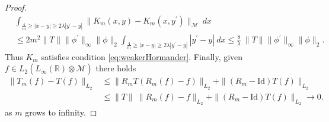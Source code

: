 \documentclass[10pt,a4paper]{amsart}
\newcommand{\Avnat}{\Linfty(\mathbb{R}) \overline{\otimes} \mathcal{M}}
\newcommand{\Linfty}{L_\infty}
\newcommand{\Ltwo}{L_2}
\newcommand{\id}{\mathrm{Id}}
\begin{document}
\begin{proof}
        \begin{align*}
            &\int_{\frac{4}{m} \geq |x-y| \geq 2\lambda |y^\prime -y|} \|K_m(x,y)-K_m(x,y^\prime)\|_{\mathcal{M}} \ dx \\
            &\leq 2 m^2 \|T\| \|\phi^\prime\|_{\infty}\|\phi\|_2 \int_{\frac{4}{m} \geq |x-y| \geq 2\lambda |y^\prime -y|} |y^\prime -y| \ dx \leq \frac{8}{\lambda} \ \|T\| \|\phi^\prime\|_{\infty} \|\phi\|_2.
        \end{align*}
        Thus $K_m$ satisfies condition \eqref{eq:weakerHormander}. Finally, given $f \in \Ltwo(\Avnat)$ there holds
        \begin{align*}
            \|T_m(f) - T(f)\|_{\Ltwo} &\leq \|R_m T (R_m(f) - f)\|_{\Ltwo} + \|(R_m - \id)T(f)\|_{\Ltwo} \\
            &\leq \|T\| \ \|R_m(f) - f\|_{\Ltwo} + \|(R_m - \id)T(f)\|_{\Ltwo} \rightarrow 0.
        \end{align*}
        as $m$ grows to infinity.
  \end{proof}
\end{document}
